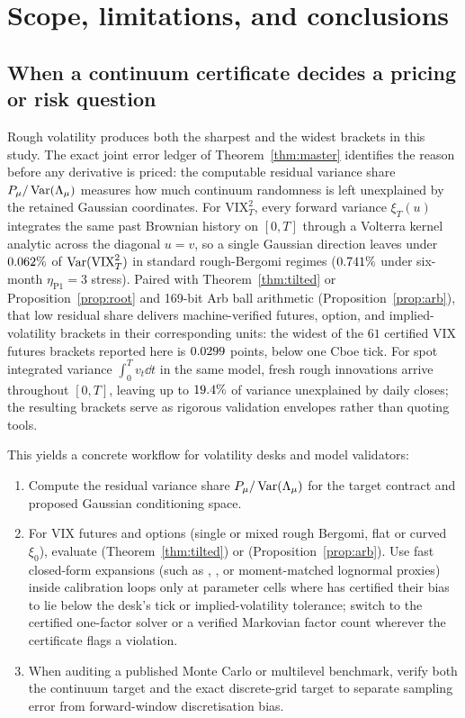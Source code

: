 \section{Scope, limitations, and conclusions}\label{sec:scope}

\subsection{When a continuum certificate decides a pricing or risk question}
Rough volatility produces both the sharpest and the widest brackets in this study. The exact joint error
ledger of Theorem~\ref{thm:master} identifies the reason before any derivative is priced: the
computable residual variance share $P_\mu/\operatorname{Var}(\Lambda_\mu)$ measures how much continuum randomness is
left unexplained by the retained Gaussian coordinates. For $\mathrm{VIX}_T^2$, every forward variance $\xi_T(u)$
integrates the same past Brownian history on $[0,T]$ through a Volterra kernel analytic across the
diagonal $u=v$, so a single Gaussian direction leaves under $0.062\%$ of $\operatorname{Var}(\mathrm{VIX}_T^2)$ in
standard rough-Bergomi regimes ($0.741\%$ under six-month $\eta_{\mathrm{P1}}=3$ stress). Paired with
Theorem~\ref{thm:tilted} or Proposition~\ref{prop:root} and 169-bit Arb ball arithmetic
(Proposition~\ref{prop:arb}), that low residual share delivers machine-verified futures, option, and
implied-volatility brackets in their corresponding units: the widest of the $61$ certified VIX futures
brackets reported here is $0.0299$ points, below one Cboe tick. For spot integrated variance
$\int_0^T v_t\dd t$ in the same model, fresh rough innovations arrive throughout $[0,T]$, leaving up to
$19.4\%$ of variance unexplained by daily closes; the resulting brackets serve as rigorous validation
envelopes rather than quoting tools.

This yields a concrete workflow for volatility desks and model validators:
\begin{enumerate}
\item Compute the residual variance share $P_\mu/\operatorname{Var}(\Lambda_\mu)$ for the target contract and
  proposed Gaussian conditioning space.
\item For VIX futures and options (single or mixed rough Bergomi, flat or curved $\xi_0$), evaluate
  \RoughCertTilt{} (Theorem~\ref{thm:tilted}) or \RoughCertCV{} (Proposition~\ref{prop:arb}). Use fast
  closed-form expansions (such as \citealp{BourgeyDeMarcoGobet2023}, \citealp{LiaoAgarwalBourgey2026}, or
  moment-matched lognormal proxies) inside calibration loops only at parameter cells where
  \RoughCert{} has certified their bias to lie below the desk's tick or implied-volatility tolerance; switch to
  the certified one-factor solver or a verified Markovian factor count wherever the certificate flags a
  violation.
\item When auditing a published Monte Carlo or multilevel benchmark, verify both the continuum target
  and the exact discrete-grid target to separate sampling error from forward-window discretisation bias.
\end{enumerate}

